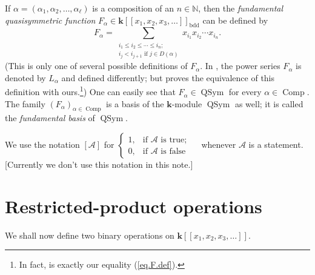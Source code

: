 \documentclass[numbers=enddot,12pt,final,onecolumn,notitlepage,abstracton]{scrartcl}%
\theoremstyle{definition}
\newenvironment{noncompile}{}{}
\let\sumnonlimits\sum
\renewcommand{\sum}{\sumnonlimits\limits}
\begin{document}
If $\alpha=\left(  \alpha_{1},\alpha_{2},\ldots,\alpha_{\ell}\right)  $ is a
composition of an $n\in\mathbb{N}$, then the \textit{fundamental
quasisymmetric function }$F_{\alpha}\in\mathbf{k}\left[  \left[  x_{1}%
,x_{2},x_{3},\ldots\right]  \right]  _{\operatorname*{bdd}}$ can be defined by%
\begin{equation}
F_{\alpha}=\sum_{\substack{i_{1}\leq i_{2}\leq\cdots\leq i_{n};\\i_{j}%
<i_{j+1}\text{ if }j\in D\left(  \alpha\right)  }}x_{i_{1}}x_{i_{2}}\cdots
x_{i_{n}}. \label{eq.F.def}%
\end{equation}
(This is only one of several possible definitions of $F_{\alpha}$. In
\cite[Definition 5.2.4]{Reiner}, the power series $F_{\alpha}$ is denoted by
$L_{\alpha}$ and defined differently; but \cite[Proposition 5.2.9]{Reiner}
proves the equivalence of this definition with ours.\footnote{In fact,
\cite[(5.2.3)]{Reiner} is exactly our equality (\ref{eq.F.def}).}) One can
easily see that $F_{\alpha}\in\operatorname*{QSym}$ for every $\alpha
\in\operatorname*{Comp}$. The family $\left(  F_{\alpha}\right)  _{\alpha
\in\operatorname*{Comp}}$ is a basis of the $\mathbf{k}$-module
$\operatorname*{QSym}$ as well; it is called the \textit{fundamental basis} of
$\operatorname*{QSym}$.

\begin{noncompile}
We use the notation $\left[  \mathcal{A}\right]  $ for $%
\begin{cases}
1, & \text{if }\mathcal{A}\text{ is true;}\\
0, & \text{if }\mathcal{A}\text{ is false}%
\end{cases}
\quad$ whenever $\mathcal{A}$ is a statement. [Currently we don't use this
notation in this note.]
\end{noncompile}


\section{\label{sect.dendri}Restricted-product operations}

We shall now define two binary operations on $\mathbf{k}\left[  \left[
x_{1},x_{2},x_{3},\ldots\right]  \right]  $.
\end{document}
